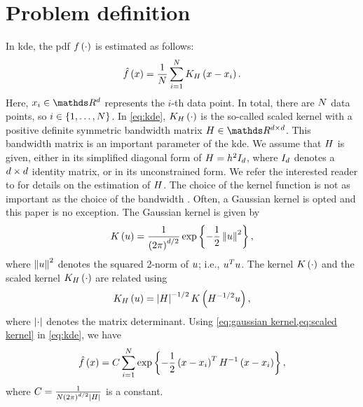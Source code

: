 \section{Problem definition}
\label{sec:problem}

In \ac{kde}, the \ac{pdf} $f\left( \cdot \right)$ is estimated as follows:
\begin{equation}
	\label{eq:kde}
	\hat{f}\left( x \right) = 
	\frac{1}{N} \sum_{i=1}^{N} 
	K_{H} \left( x - x_{i} \right).
\end{equation}
Here, $\datapoint{\indexdata} \in \realnumbers^{\dimension}$ represents the $i$-th data point.
In total, there are $N$ data points, so $i \in \{1, \ldots, N\}$.
In \cref{eq:kde}, $K_{H} \left( \cdot \right)$ is the so-called scaled kernel with a positive definite symmetric bandwidth matrix $\bandwidthmatrix \in \realnumbers^{\dimension \times \dimension}$.
This bandwidth matrix is an important parameter of the \ac{kde}. 
We assume that $H$ is given, either in its simplified diagonal form of $H=h^2 I_{d}$, where $I_{d}$ denotes a $d\times d$ identity matrix, or in its unconstrained form.
We refer the interested reader to \autocite{turlach1993bandwidthselection, jones1996brief, duong2007ks, gramacki2017fft} for details on the estimation of $H$.
The choice of the kernel function is not as important as the choice of the bandwidth \autocite{turlach1993bandwidthselection}.
Often, a Gaussian kernel is opted and this paper is no exception.
The Gaussian kernel is given by
\begin{equation}
	\label{eq:gaussian kernel}
	K \left( u \right) = \frac{1}{\left(2 \pi \right)^{d/2}} \exp\left\{  -\frac{1}{2} \left\Vert u \right\Vert^2 \right\},
\end{equation}
where $\left\Vert u \right\Vert^2$ denotes the squared 2-norm of $u$; i.e., $u^T u$.
The kernel $K \left( \cdot \right)$ and the scaled kernel $K_{H} \left( \cdot \right)$ are related using
\begin{equation}
	\label{eq:scaled kernel}
	K_{H} \left( u \right)
	= \left| H \right|^{-1/2} K \left(  H^{-1/2} u  \right),
\end{equation}
where $\left| \cdot \right|$ denotes the matrix determinant.
Using \cref{eq:gaussian kernel,eq:scaled kernel} in \cref{eq:kde}, we have
\begin{equation}
	\label{eq:gaussian kde}
	\hat{f}\left( x \right)
	= C
	\sum_{i=1}^{N} 
	\exp\left\{ -\frac{1}{2} \left( x - x_{i} \right)^T H^{-1} \left( x - x_{i} \right) \right\},
\end{equation}
where $C=\frac{1}{N \left(2\pi\right)^{d/2} \left| H \right|}$ is a constant.



